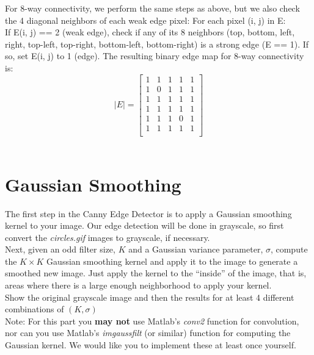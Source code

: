 \documentclass[12pt]{article}
\begin{document}
\begin{enumerate}
For 8-way connectivity, we perform the same steps as above, but we also check the 4 diagonal neighbors of each weak edge pixel:
For each pixel (i, j) in E:\\

If E(i, j) == 2 (weak edge), check if any of its 8 neighbors (top, bottom, left, right, top-left, top-right, bottom-left, bottom-right) is a strong edge (E == 1). If so, set E(i, j) to 1 (edge).
The resulting binary edge map for 8-way connectivity is:\\

$$ |E|=
\begin{bmatrix}
1& 1& 1& 1& 1\\
1& 0& 1& 1& 1\\
1& 1& 1& 1& 1\\
1& 1& 1& 1& 1\\
1& 1& 1& 0& 1\\
1& 1& 1& 1& 1\\
\end{bmatrix}
$$
\\

\end{enumerate}


\newpage
\section{Gaussian Smoothing}
The first step in the Canny Edge Detector is to apply a Gaussian smoothing kernel to your image.  Our edge detection will be done in grayscale, so first convert the \emph{circles.gif}  images to grayscale, if necessary.\\

\noindent
Next, given an odd filter size, $K$ and a Gaussian variance parameter, $\sigma$, compute the $K\times K$ Gaussian smoothing kernel and apply it to the image to generate a smoothed new image.   Just apply the kernel to the “inside” of the image, that is, areas where there is a large enough neighborhood to apply your kernel.\\

\noindent
Show the original grayscale image and then the results for at least 4 different combinations of $(K,\sigma)$\\

\noindent
Note:  For this part you \textbf{may not} use Matlab’s \emph{conv2} function for convolution, nor can you use Matlab's \emph{imgaussfilt} (or similar) function for computing the Gaussian kernel.  We would like you to implement these at least once yourself.\\
\end{document}
